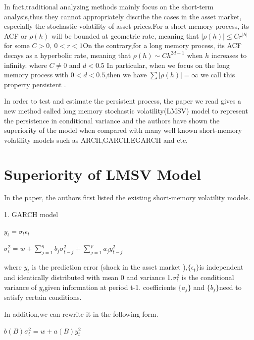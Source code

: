\documentclass[10pt,a4paper]{article}
\begin{document}
 In fact,traditional analyzing methods mainly focus on the short-term analysis,thus they cannot appropriately discribe the cases in the asset market, especially  the stochastic volatility  of asset prices.For a short memory process, its ACF or $\rho(h)$ will be bounded at geometric rate, meaning that $|\rho(h)|\leq C r^{|h|}$ for some $C>0,\  0<r<1 $On the contrary,for a long memory process, its ACF decays as a hyperbolic rate, meaning that $\rho(h)\sim Ch^{2d-1}$ when $h$ increases to infinity. where $C\neq 0$ and $d<0.5$ In particular, when we focus on the long memory process with $0<d<0.5$,then we have $\sum |\rho(h)|=\infty$ we call this property persistent .
 
In order to test and estimate the persistent process, the paper we read gives a new method called long memory stochastic volatility(LMSV) model to represent the persistence in conditional variance and the authors have shown the superiority of the model when compared with many well known short-memory volatility models such as ARCH,GARCH,EGARCH and etc.




 
\section{Superiority of LMSV Model}

In the paper, the authors first listed the existing short-memory volatility models.

\vspace{0.5cm}

1. GARCH model 

\begin{center}$\displaystyle y_t=\sigma_t\epsilon_t$\end{center}

\begin{center} $\displaystyle \sigma_t^2=w+\sum_{j=1}^{q}b_j\sigma^2_{t-j}+\sum_{j=1}^{p}a_jy^2_{t-j} $ \end{center}

where $y_t$ is the prediction error (shock in the asset market ),$ \{ \epsilon_t\} $is independent and identically distributed with mean 0 and variance 1.$\sigma^2_t$ is the conditional variance of $y_t $given information at period t-1.
coefficients $\{a_j\}$ and $\{b_j\}$need to satisfy certain conditions.

In addition,we can rewrite it in the following form.

\begin{center}$\displaystyle b(B)\sigma^2_t=w+a(B)y^2_t$\end{center} 
\end{document}
